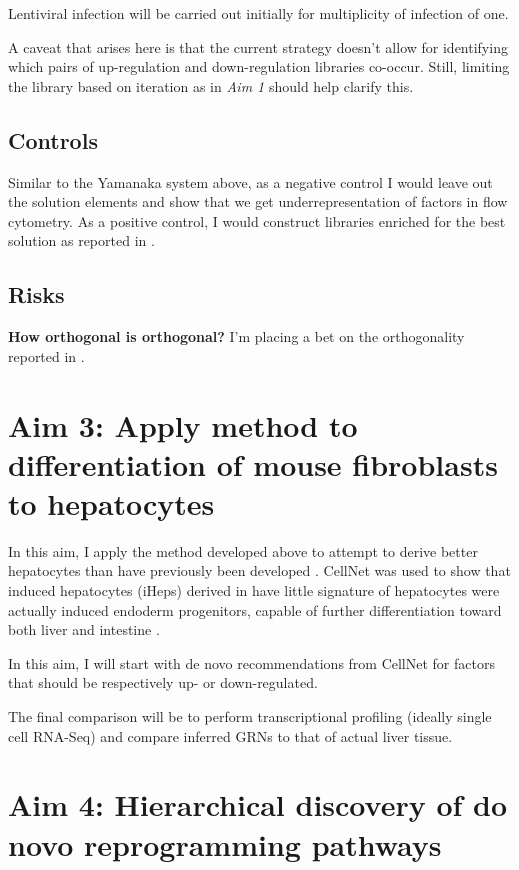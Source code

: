 \documentclass[10pt]{article}
\begin{document}
Lentiviral infection will be carried out initially for multiplicity of infection of one.

A caveat that arises here is that the current strategy doesn't allow for identifying which pairs of up-regulation and down-regulation libraries co-occur. Still, limiting the library based on iteration as in \textit{Aim 1} should help clarify this.

\subsection{Controls}

Similar to the Yamanaka system above, as a negative control I would leave out the solution elements and show that we get underrepresentation of factors in flow cytometry. As a positive control, I would construct libraries enriched for the best solution as reported in \cite{morris2014dissecting}.

\subsection{Risks}

\textbf{How orthogonal is orthogonal?} I'm placing a bet on the orthogonality reported in \cite{esvelt2013orthogonal}.

\section{Aim 3: Apply method to differentiation of mouse fibroblasts to hepatocytes}

In this aim, I apply the method developed above to attempt to derive better hepatocytes than have previously been developed \cite{huang2011induction, sekiya2011direct}. CellNet was used to show that induced hepatocytes (iHeps) derived in \cite{sekiya2011direct} have little signature of hepatocytes were actually induced endoderm progenitors, capable of further differentiation toward both liver and intestine \cite{morris2014dissecting}.

In this aim, I will start with de novo recommendations from CellNet for factors that should be respectively up- or down-regulated.

The final comparison will be to perform transcriptional profiling (ideally single cell RNA-Seq) and compare inferred GRNs to that of actual liver tissue.

\section*{Aim 4: Hierarchical discovery of do novo reprogramming pathways}
\end{document}
